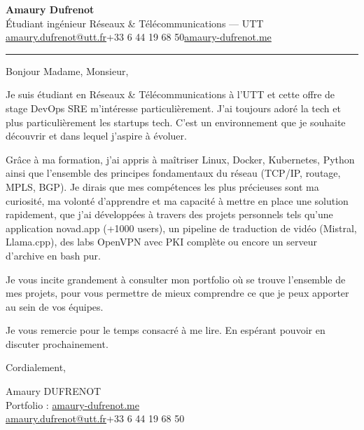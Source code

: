 \documentclass[a4paper, 10.5pt]{article}
\newcommand{\headingfont}{\fontfamily{Raleway-TLF}\selectfont}
\begin{document}
\color{bodytext}

\begin{center}
{\headingfont\fontsize{20}{24}\selectfont\bfseries\color{titletext}Amaury Dufrenot}\\[4pt]
{\small\color{mutedtext}Étudiant ingénieur Réseaux \& Télécommunications — UTT}\\[6pt]
{\small\color{mutedtext}\href{mailto:amaury.dufrenot@utt.fr}{amaury.dufrenot@utt.fr}\hspace{6pt}{\color{sep}\textbar}\hspace{6pt}+33 6 44 19 68 50\hspace{6pt}{\color{sep}\textbar}\hspace{6pt}\href{https://amaury-dufrenot.me}{amaury-dufrenot.me}}\\[8pt]
{\color{accent}\rule{0.35\textwidth}{0.8pt}}
\end{center}

\vspace{6mm}

Bonjour Madame, Monsieur,

Je suis étudiant en Réseaux \& Télécommunications à l'UTT et cette offre de stage DevOps SRE m'intéresse particulièrement. J'ai toujours adoré la tech et plus particulièrement les startups tech. C'est un environnement que je souhaite découvrir et dans lequel j'aspire à évoluer.

Grâce à ma formation, j'ai appris à maîtriser Linux, Docker, Kubernetes, Python ainsi que l'ensemble des principes fondamentaux du réseau (TCP/IP, routage, MPLS, BGP). Je dirais que mes compétences les plus précieuses sont ma curiosité, ma volonté d'apprendre et ma capacité à mettre en place une solution rapidement, que j'ai développées à travers des projets personnels tels qu'une application novad.app (+1000 users), un pipeline de traduction de vidéo (Mistral, Llama.cpp), des labs OpenVPN avec PKI complète ou encore un serveur d'archive en bash pur.

Je vous incite grandement à consulter mon portfolio où se trouve l'ensemble de mes projets, pour vous permettre de mieux comprendre ce que je peux apporter au sein de vos équipes.

Je vous remercie pour le temps consacré à me lire. En espérant pouvoir en discuter prochainement.

\vspace{2mm}

Cordialement,

\vspace{3mm}
{\small\color{mutedtext}Amaury DUFRENOT}\\[1.5pt]
{\small\color{mutedtext}Portfolio : \href{https://amaury-dufrenot.me}{amaury-dufrenot.me}}\\[1.5pt]
{\small \href{mailto:amaury.dufrenot@utt.fr}{\color{mutedtext}amaury.dufrenot@utt.fr}\hspace{6pt}{\color{sep}\textbar}\hspace{6pt}\color{mutedtext}+33 6 44 19 68 50}
\end{document}
